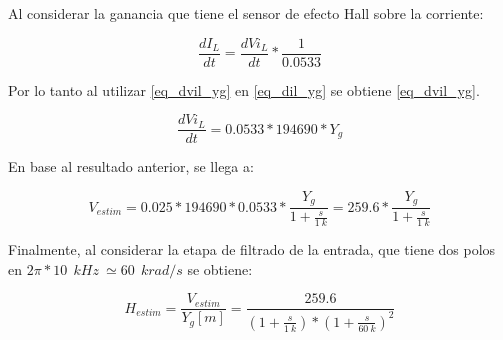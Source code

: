Al considerar la ganancia que tiene el sensor de efecto Hall sobre la corriente:

\begin{equation} \label{eq_dil_dvil}
	\frac{dI_{L}}{dt} =\frac{dVi_{L}}{dt}*\frac{1}{0.0533}
\end{equation}

Por lo tanto al utilizar \ref{eq_dvil_yg} en \ref{eq_dil_yg} se obtiene \ref{eq_dvil_yg}.

\begin{equation} \label{eq_dvil_yg}
	\frac{dVi_{L}}{dt} = 0.0533*194690*Y_{g}
\end{equation}


En base al resultado anterior, se llega a:



\begin{equation}
	V_{estim}=0.025*194690*0.0533 * \frac{Y_{g}}{1 + \frac{s}{1\:k}}=259.6*\frac{Y_{g}}{1 + \frac{s}{1\:k}}	
\end{equation}

Finalmente, al considerar la etapa de filtrado de la entrada, que tiene dos polos en $2\pi *10\: \:{kHz}\ \simeq 60\: \:{krad/s}$ se obtiene:

\begin{equation} \label{eq_TLC_deriv_7}
	H_{estim}=\frac{V_{estim}}{Y_{g}[m]}=\frac{259.6}{(1+\frac{s}{1\:k})*{(1+\frac{s}{60\: k})}^2}
\end{equation}


